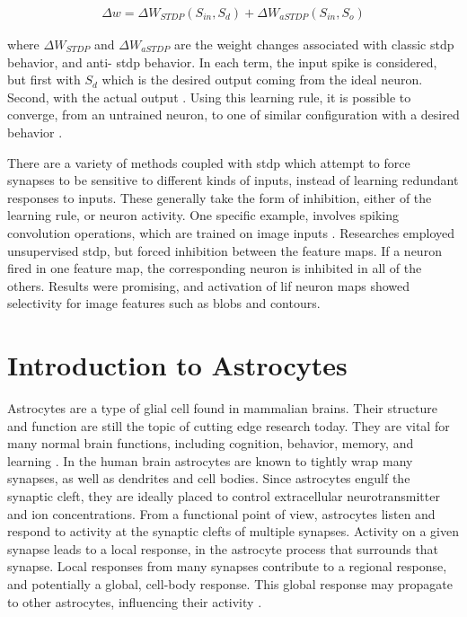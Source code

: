 \documentclass[conference]{IEEEtran}
\newcommand{\eq}[1]{Equation (\ref{#1})}
\begin{document}
\begin{align}
  \Delta w = \Delta W_{STDP}(S_{in}, S_{d}) + \Delta W_{aSTDP}(S_{in}, S_{o}) \label{eq:resume_stdp}
\end{align}

\noindent where $\Delta W_{STDP}$ and $\Delta W_{aSTDP}$ are the weight changes
associated with classic \gls{stdp} behavior, and anti- \gls{stdp} behavior. In
each term, the input spike is considered, but first with $S_{d}$ which is the
desired output coming from the ideal neuron. Second, with the actual output
\parencite{mozafari_2018}. Using this learning rule, it is possible to converge,
from an untrained neuron, to one of similar configuration with a desired
behavior \parencite{ponulak_2010}.


There are a variety of methods coupled with \gls{stdp} which attempt to force
synapses to be sensitive to different kinds of inputs, instead of learning
redundant responses to inputs. These generally take the form of inhibition,
either of the learning rule, or neuron activity. One specific example, involves
spiking convolution operations, which are trained on image inputs
\parencite{delorme_2001}. Researches employed unsupervised \gls{stdp}, but
forced inhibition between the feature maps. If a neuron fired in one feature
map, the corresponding neuron is inhibited in all of the others. Results were
promising, and activation of \gls{lif} neuron maps showed selectivity for image
features such as blobs and contours.

\section{Introduction to Astrocytes}
Astrocytes are a type of glial cell found in mammalian brains. Their
structure and function are still the topic of cutting edge research
today. They are vital for many normal brain functions, including
cognition, behavior, memory, and learning \parencite{mederos_2018}. In the human
brain astrocytes are known to tightly wrap many synapses, as well as dendrites and cell
bodies. Since astrocytes engulf the synaptic cleft, they are ideally
placed to control extracellular neurotransmitter and ion
concentrations. From a functional point of view, astrocytes listen and
respond to activity at the synaptic clefts of multiple synapses. Activity on
a given synapse leads to a local response, in the astrocyte process that
surrounds that synapse. Local responses from many synapses contribute to a
regional response, and potentially a global, cell-body response. This global
response may propagate to other astrocytes, influencing their activity
\parencite{min_2012}.
\end{document}

